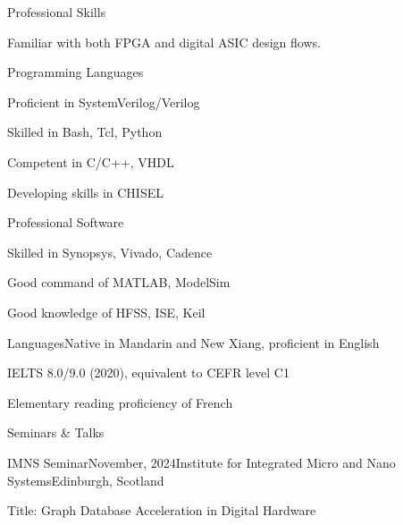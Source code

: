\documentclass{resume} %
\begin{document}
\begin{rSection}{Professional Skills}

	Familiar with both FPGA and digital ASIC design flows. 
	
	\begin{rSubsection}{Programming Languages}{}{}{}
		\item Proficient in SystemVerilog/Verilog
		\item Skilled in Bash, Tcl, Python
		\item Competent in C/C++, VHDL
		\item Developing skills in CHISEL
	\end{rSubsection}

	\begin{rSubsection}{Professional Software}{}{}{}
		\item Skilled in Synopsys, Vivado, Cadence
		\item Good command of MATLAB, ModelSim
		\item Good knowledge of HFSS, ISE, Keil
	\end{rSubsection}

	\begin{rSubsection}{Languages}{}{Native in Mandarin and New Xiang, proficient in English}{}
		\item IELTS 8.0/9.0 (2020), equivalent to CEFR level C1
		\item Elementary reading proficiency of French
	\end{rSubsection}

\end{rSection}

\newpage

\begin{rSection}{Seminars \& Talks}
	
	
	\begin{rSubsection}{IMNS Seminar}{November, 2024}{Institute for Integrated Micro and Nano Systems}{Edinburgh, Scotland}
		\item Title: Graph Database Acceleration in Digital Hardware
	\end{rSubsection}
	
\end{rSection}
\end{document}
